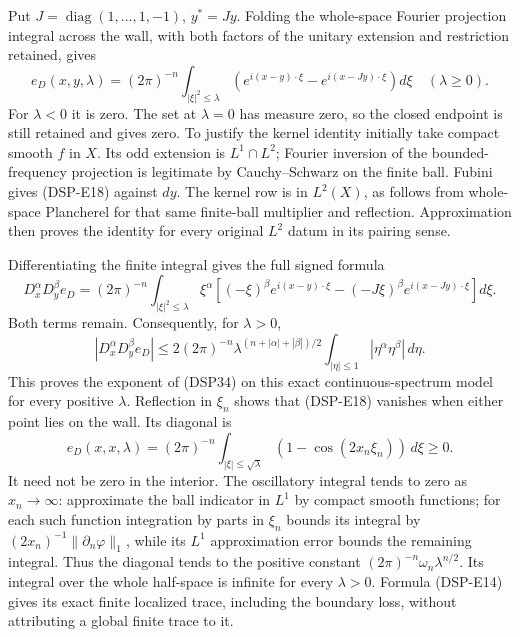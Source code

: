 \documentclass[
  11pt,
]{article}
\begin{document}
Put \(J=\operatorname{diag}(1,\ldots,1,-1)\), \(y^*=Jy\). Folding the
whole-space Fourier projection integral across the wall, with both
factors of the unitary extension and restriction retained, gives \[
 e_D(x,y,\lambda)=(2\pi)^{-n}\int_{|\xi|^2\leq\lambda}
 \left(e^{i(x-y)\cdot\xi}-e^{i(x-Jy)\cdot\xi}\right)d\xi
 \quad(\lambda\geq0).
 \tag{DSP-E18}
\] For \(\lambda<0\) it is zero. The set at \(\lambda=0\) has measure
zero, so the closed endpoint is still retained and gives zero. To
justify the kernel identity initially take compact smooth \(f\) in
\(X\). Its odd extension is \(L^1\cap L^2\); Fourier inversion of the
bounded-frequency projection is legitimate by Cauchy--Schwarz on the
finite ball. Fubini gives (DSP-E18) against \(dy\). The kernel row is in
\(L^2(X)\), as follows from whole-space Plancherel for that same
finite-ball multiplier and reflection. Approximation then proves the
identity for every original \(L^2\) datum in its pairing sense.

Differentiating the finite integral gives the full signed formula \[
 D_x^\alpha D_y^\beta e_D
 =(2\pi)^{-n}\int_{|\xi|^2\leq\lambda}
 \xi^\alpha\left[(-\xi)^\beta e^{i(x-y)\cdot\xi}
              -(-J\xi)^\beta e^{i(x-Jy)\cdot\xi}\right]d\xi.
 \tag{DSP-E19}
\] Both terms remain. Consequently, for \(\lambda>0\), \[
 |D_x^\alpha D_y^\beta e_D|
 \leq2(2\pi)^{-n}\lambda^{(n+|\alpha|+|\beta|)/2}
             \int_{|\eta|\leq1}|\eta^\alpha\eta^\beta|\,d\eta.
 \tag{DSP-E20}
\] This proves the exponent of (DSP34) on this exact continuous-spectrum
model for every positive \(\lambda\). Reflection in \(\xi_n\) shows that
(DSP-E18) vanishes when either point lies on the wall. Its diagonal is
\[
 e_D(x,x,\lambda)=(2\pi)^{-n}\int_{|\xi|\leq\sqrt\lambda}
                   (1-\cos(2x_n\xi_n))\,d\xi\geq0.
 \tag{DSP-E21}
\] It need not be zero in the interior. The oscillatory integral tends
to zero as \(x_n\to\infty\): approximate the ball indicator in \(L^1\)
by compact smooth functions; for each such function integration by parts
in \(\xi_n\) bounds its integral by
\((2x_n)^{-1}\|\partial_n\varphi\|_1\), while its \(L^1\) approximation
error bounds the remaining integral. Thus the diagonal tends to the
positive constant \((2\pi)^{-n}\omega_n\lambda^{n/2}\). Its integral
over the whole half-space is infinite for every \(\lambda>0\). Formula
(DSP-E14) gives its exact finite localized trace, including the boundary
loss, without attributing a global finite trace to it.
\end{document}
